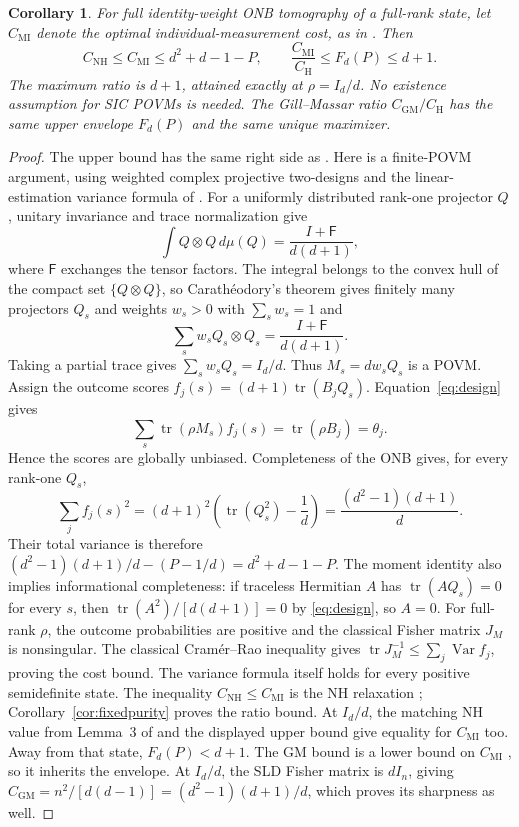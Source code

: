 \documentclass[11pt]{article}
\newcommand{\tr}{\operatorname{tr}}
\newcommand{\Id}{I}
\newcommand{\CH}{C_{\mathrm H}}
\newcommand{\CN}{C_{\mathrm{NH}}}
\newcommand{\CM}{C_{\mathrm{MI}}}
\newtheorem{corollary}[theorem]{Corollary}
\begin{document}
\begin{corollary}\label{cor:mi}
For full identity-weight ONB tomography of a full-rank state, let $\CM$
denote the optimal individual-measurement cost, as in \cite[Eq.~(3)]{Das}.
Then
\[
 \CN\leq\CM\leq d^2+d-1-P,\qquad
 \frac{\CM}{\CH}\leq F_d(P)\leq d+1.
\]
The maximum ratio is $d+1$, attained exactly at $\rho=\Id_d/d$.
No existence assumption for SIC POVMs is needed.
The Gill--Massar ratio $C_{\mathrm{GM}}/\CH$ has the same upper envelope
$F_d(P)$ and the same unique maximizer.
\end{corollary}
\begin{proof}
The upper bound has the same right side as \cite[Eq.~(55)]{Das}.
Here is a finite-POVM argument, using weighted complex projective
two-designs and the linear-estimation variance formula of
\cite[Proposition~13, Eqs.~(101)--(103)]{Scott}.
For a uniformly distributed rank-one projector $Q$,
unitary invariance and trace normalization give
\[
 \int Q\otimes Q\,d\mu(Q)=\frac{\Id+\mathsf F}{d(d+1)},
\]
where $\mathsf F$ exchanges the tensor factors. The integral belongs to
the convex hull of the compact set $\{Q\otimes Q\}$, so Carath\'eodory's
theorem gives finitely many projectors $Q_s$ and weights $w_s>0$ with
$\sum_s w_s=1$ and
\begin{equation}\label{eq:design}
 \sum_s w_s Q_s\otimes Q_s=\frac{\Id+\mathsf F}{d(d+1)}.
\end{equation}
Taking a partial trace gives $\sum_s w_sQ_s=\Id_d/d$.
Thus $M_s=dw_sQ_s$ is a POVM. Assign the outcome scores
$f_j(s)=(d+1)\tr(B_jQ_s)$. Equation~\eqref{eq:design} gives
\[
 \sum_s\tr(\rho M_s) f_j(s)=\tr(\rho B_j)=\theta_j.
\]
Hence the scores are globally unbiased. Completeness of the ONB gives,
for every rank-one $Q_s$,
\[
 \sum_j f_j(s)^2=(d+1)^2\left(\tr(Q_s^2)-\frac1d\right)
 =\frac{(d^2-1)(d+1)}d.
\]
Their total variance is therefore
$(d^2-1)(d+1)/d-(P-1/d)=d^2+d-1-P$.
The moment identity also implies informational completeness: if traceless
Hermitian $A$ has $\tr(AQ_s)=0$ for every $s$, then
$\tr(A^2)/[d(d+1)]=0$ by \eqref{eq:design}, so $A=0$.
For full-rank $\rho$, the outcome probabilities are positive and the
classical Fisher matrix $J_M$ is nonsingular. The classical Cram\'er--Rao
inequality gives $\tr J_M^{-1}\leq\sum_j\operatorname{Var}f_j$, proving
the cost bound. The variance formula itself holds for every positive
semidefinite state.
The inequality $\CN\leq\CM$ is the NH relaxation
\cite[Eq.~(8)]{Das}; Corollary~\ref{cor:fixedpurity} proves the ratio bound.
At $\Id_d/d$, the matching NH value from Lemma~3 of \cite{Das} and the
displayed upper bound give equality for $\CM$ too. Away from that state,
$F_d(P)<d+1$.
The GM bound is a lower bound on $\CM$ \cite[Eq.~(158)]{Das}, so it
inherits the envelope. At $\Id_d/d$, the SLD Fisher matrix is
$d\Id_n$, giving $C_{\mathrm{GM}}=n^2/[d(d-1)]=(d^2-1)(d+1)/d$,
which proves its sharpness as well.
\end{proof}
\end{document}
